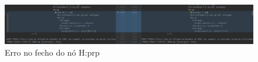 \begin{figure}[!h]
    \centering
    \includegraphics[width=\textwidth,scale=1.5]{imagens/erro_escrita_2626.png}
    \caption[Erro no fecho do nó H:prp]{Erro no fecho do nó H:prp}
    \label{fig:bosque_erro_no_fechado_errado}
\end{figure}